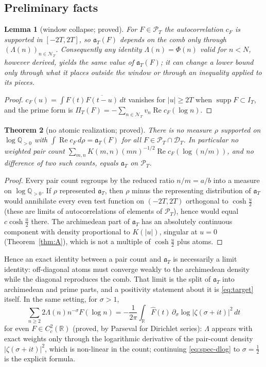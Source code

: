 \documentclass[11pt]{amsart}
\newtheorem{theorem}{Theorem}[section]
\newtheorem{lemma}[theorem]{Lemma}
\theoremstyle{definition}
\theoremstyle{remark}
\newcommand{\R}{\mathbb R}
\newcommand{\Q}{\mathbb Q}
\newcommand{\Rel}{\operatorname{Re}}
\newcommand{\supp}{\operatorname{supp}}
\newcommand{\PT}{\mathcal P_T}
\newcommand{\IT}{I_T}
\newcommand{\Fh}{\widehat F}
\newcommand{\cF}{c_F}
\newcommand{\NT}{\mathcal N_T}
\newcommand{\PiT}{\Pi_T}
\begin{document}
\subsection{Preliminary facts}

\begin{lemma}[window collapse; proved]\label{lem:spec-collapse}
For $F\in\PT$ the autocorrelation $\cF$ is supported in $[-2T,2T]$, so $\mathfrak a_T(F)$ depends on the comb only through
$(\Lambda(n))_{n\in\NT}$. Consequently any identity $\Lambda(n)=\Phi(n)$ valid for $n<N$, however derived, yields the same value of
$\mathfrak a_T(F)$; it can change a lower bound only through what it places outside the window or through an inequality applied to its
pieces.
\end{lemma}
\begin{proof}
$\cF(u)=\int F(t)\overline{F(t-u)}\,dt$ vanishes for $|u|\ge2T$ when $\supp F\subset\IT$, and the prime form is
$\PiT(F)=-\sum_{n\in\NT}v_n\Rel\cF(\log n)$.
\end{proof}

\begin{theorem}[no atomic realization; proved]\label{thm:spec-noatom}
There is no measure $\rho$ supported on $\log\Q_{>0}$ with $\int\Rel\cF\,d\rho=\mathfrak a_T(F)$ for all $F\in\PT\cap\mathcal D_T$. In
particular no weighted pair count $\sum_{m,n}K(m,n)(mn)^{-1/2}\Rel\cF(\log(n/m))$, and no difference of two such counts, equals
$\mathfrak a_T$ on $\PT$.
\end{theorem}
\begin{proof}
Every pair count regroups by the reduced ratio $n/m=a/b$ into a measure on $\log\Q_{>0}$. If $\rho$ represented $\mathfrak a_T$, then
$\rho$ minus the representing distribution of $\mathfrak a_T$ would annihilate every even test function on $(-2T,2T)$ orthogonal to
$\cosh\frac u2$ (these are limits of autocorrelations of elements of $\PT$), hence would equal $c\cosh\frac u2$ there. The archimedean
part of $\mathfrak a_T$ has an absolutely continuous component with density proportional to $K(|u|)$, singular at $u=0$ (Theorem~\ref{thm:A}),
which is not a multiple of $\cosh\frac u2$ plus atoms.
\end{proof}

Hence an exact identity between a pair count and $\mathfrak a_T$ is necessarily a limit identity: off-diagonal atoms must converge
weakly to the archimedean density while the diagonal reproduces the comb. That limit is the split of $\mathfrak a_T$ into archimedean
and prime parts, and a positivity statement about it is \eqref{eq:target} itself. In the same setting, for $\sigma>1$,
\begin{equation}\label{eq:spec-dlog}
\sum_{n\ge2}2\Lambda(n)n^{-\sigma}F(\log n)=-\frac1{2\pi}\int_\R\Fh(t)\,\partial_\sigma\log|\zeta(\sigma+it)|^2\,dt
\end{equation}
for even $F\in C^2_c(\R)$ (proved, by Parseval for Dirichlet series): $\Lambda$ appears with exact weights only through the logarithmic
derivative of the pair-count density $|\zeta(\sigma+it)|^2$, which is non-linear in the count; continuing \eqref{eq:spec-dlog} to
$\sigma=\frac12$ is the explicit formula.
\end{document}
